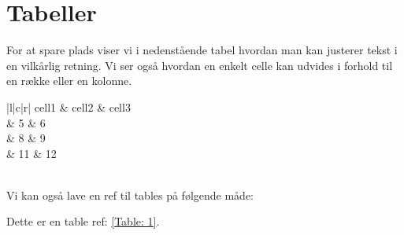 \documentclass[class=report, crop=false]{standalone}
\begin{document}
    \section{Tabeller}
    For at spare plads viser vi i nedenstående tabel hvordan man kan justerer tekst i en vilkårlig retning. Vi ser også hvordan en enkelt celle kan udvides i forhold til en række eller en kolonne.
    \begin{tcblisting}{}
        \begin{center}
            \begin{tabular}{ |l|c|r| }\hline
            cell1 & cell2 & cell3 \\\hline
             & 5 & 6 \\
            & 8 & 9 \\
            & 11 & 12 \\\hline
             \\\hline
            \end{tabular}
        \end{center}
    \end{tcblisting}

    \noindent Vi kan også lave en ref til tables på følgende måde:
    \begin{tcblisting}{}
        Dette er en table ref: \ref{Table: 1}.
    \end{tcblisting}
\end{document}
